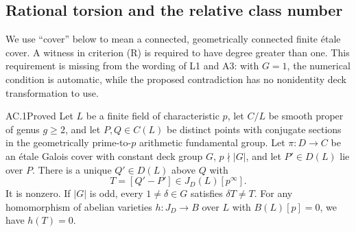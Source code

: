 \subsection{Rational torsion and the relative class number}

We use ``cover'' below to mean a connected, geometrically connected finite
\'etale cover.  A witness in criterion (R) is required to have degree greater
than one.  This requirement is missing from the wording of L1 and A3: with
$G=1$, the numerical condition is automatic, while the proposed contradiction
has no nonidentity deck transformation to use.

\begin{claim}{AC.1}{Proved}
Let $L$ be a finite field of characteristic $p$, let $C/L$ be smooth proper
of genus $g\ge2$, and let $P,Q\in C(L)$ be distinct points with conjugate
sections in the geometrically prime-to-$p$ arithmetic fundamental group.
Let $\pi:D\to C$ be an \'etale Galois cover with constant deck group $G$,
$p\nmid |G|$, and let $P'\in D(L)$ lie over $P$.  There is a unique
$Q'\in D(L)$ above $Q$ with
\[
                 T=[Q'-P']\in J_D(L)[p^\infty].
\]
It is nonzero.  If $|G|$ is odd, every $1\ne\delta\in G$ satisfies
$\delta T\ne T$.  For any homomorphism of abelian varieties
$h:J_D\to B$ over $L$ with $B(L)[p]=0$, we have $h(T)=0$.
\end{claim}
